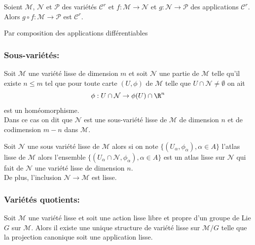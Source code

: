 \begin{pro}
Soient $\mathcal{M}$, $\mathcal{N}$ et $\mathcal{P}$ des variétés $\mathscr{C}^r$ et $f:\mathcal{M}\to \mathcal{N}$ et $g:\mathcal{N}\to\mathcal{P}$ des applications $\mathscr{C}^r$. Alors $g \circ f: \mathcal{M} \to \mathcal{P}$ est $\mathscr{C}^r$.
\end{pro}
\begin{preu}
Par composition des applications différentiables
\end{preu}

\subsubsection{Sous-variétés:}

\begin{defi}
Soit $\mathcal{M}$ une variété lisse de dimension $m$ et soit $\mathcal{N}$ une partie de $\mathcal{M}$ telle qu'il existe $n\leq m$ tel que pour toute carte $(U, \phi)$ de $\mathcal{M}$ telle que $U \cap \mathcal{N} \neq \emptyset$ on ait
$$\phi : U\cap \mathcal{N} \to \phi(U)\cap \R^n$$
est un homéomorphisme.\\
Dans ce cas on dit que $\mathcal{N}$ est une sous-variété lisse de $\mathcal{M}$ de dimension $n$ et de codimension $m-n$ dans $\mathcal{M}$.
\end{defi}

\begin{pro}
Soit $\mathcal{N}$ une sous variété lisse de $\mathcal{M}$ alors si on note $\{(U_\alpha, \phi_\alpha), \alpha \in A\}$ l'atlas lisse de $\mathcal{M}$ alors l'ensemble $\{(U_\alpha \cap \mathcal{N}, \phi_\alpha), \alpha \in A\}$ est un atlas lisse sur $\mathcal{N}$ qui fait de $\mathcal{N}$ une variété lisse de dimension $n$. \\
De plus, l'inclusion $\mathcal{N} \to \mathcal{M}$ est lisse.
\end{pro}

\subsubsection{Variétés quotients:}

\begin{defi}
Soit $\mathcal{M}$ une variété lisse et soit une action lisse libre et propre d'un groupe de Lie $G$ sur $\mathcal{M}$. Alors il existe une unique structure de variété lisse sur $\mathcal{M}/G$ telle que la projection canonique soit une application lisse.
\end{defi}

